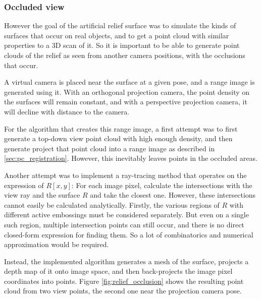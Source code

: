 \subsubsection{Occluded view}
However the goal of the artificial relief surface was to simulate the kinds of surfaces that occur on real objects, and to get a point cloud with similar properties to a 3D scan of it. So it is important to be able to generate point clouds of the relief as seen from another camera positions, with the occlusions that occur.

A virtual camera is placed near the surface at a given pose, and a range image is generated using it. With an orthogonal projection camera, the point density on the surfaces will remain constant, and with a perspective projection camera, it will decline with distance to the camera.

For the algorithm that creates this range image, a first attempt was to first generate a top-down view point cloud with high enough density, and then generate project that point cloud into a range image as described in \ref{sec:pc_registration}. However, this inevitably leaves points in the occluded areas.

Another attempt was to implement a ray-tracing method that operates on the expression of $R[x,y]$: For each image pixel, calculate the intersections with the view ray and the surface $R$ and take the closest one. However, these intersections cannot easily be calculated analytically. Firstly, the various regions of $R$ with different active embossings must be considered separately. But even on a single such region, multiple intersection points can still occur, and there is no direct closed-form expression for finding them. So a lot of combinatorics and numerical approximation would be required.

Instead, the implemented algorithm generates a mesh of the surface, projects a depth map of it onto image space, and then back-projects the image pixel coordinates into points. Figure \ref{fig:relief_occlusion} shows the resulting point cloud from two view points, the second one near the projection camera pose.

